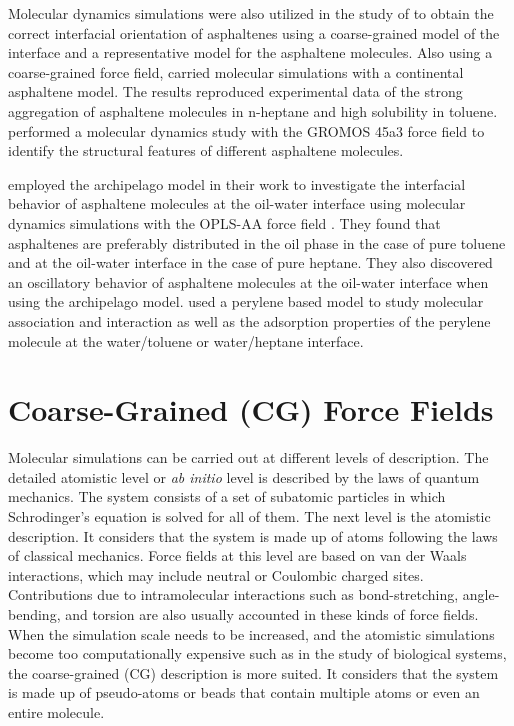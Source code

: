 Molecular dynamics simulations were also utilized in the study of   to obtain the correct interfacial orientation of asphaltenes using a coarse-grained model of the interface and a representative model for the asphaltene molecules. Also using a coarse-grained force field,  carried molecular simulations with a continental asphaltene model. The results reproduced experimental data of the strong aggregation
of asphaltene molecules in n-heptane and high solubility in toluene.  performed a molecular
dynamics study with the GROMOS 45a3 force field \cite{JCC:JCC1078} to identify the structural features of different asphaltene molecules.

 employed the archipelago model in their work to investigate the interfacial behavior of asphaltene molecules at the oil-water interface using molecular dynamics simulations with the OPLS-AA force field \cite{doi:10.1021/ja00214a001}. They found that asphaltenes are preferably distributed in the oil phase in the case of pure toluene and at the oil-water interface
in the case of pure heptane. They also discovered an
oscillatory behavior of asphaltene molecules at the oil-water interface when using the archipelago model.  used a perylene based model to study molecular association and interaction as well as the adsorption properties of the perylene molecule at the water/toluene or water/heptane interface. 

\section{Coarse-Grained (CG) Force Fields}


Molecular simulations can be carried out at different levels of description. The detailed atomistic level or \textit{ab initio} level is described by the laws of quantum mechanics. The system consists of a set of subatomic particles in which Schrodinger's equation is solved for all of them. The next level is the atomistic description. It considers that the system is made up of atoms following the laws of classical mechanics.  Force fields at this level are based on van der Waals interactions, which may include neutral or Coulombic charged sites. Contributions due to intramolecular interactions such as bond-stretching, angle-bending, and torsion are also usually accounted in these kinds of force fields. When the simulation scale needs to be increased, and the atomistic simulations become too computationally expensive such as in the study of biological systems, the coarse-grained (CG) description is more suited. It considers that the system is made up of pseudo-atoms or beads that contain multiple atoms or even an entire molecule. 

